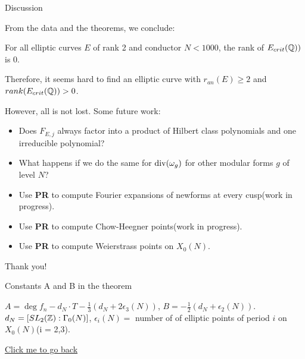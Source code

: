 \documentclass[handout]{beamer}
\begin{document}
\begin{frame}{Discussion}

From the data and the theorems, we conclude:
\begin{Corollary}
For all elliptic curves $E$ of rank 2 and conductor $N <1000$, the rank of $E_{crit}(\mathbb{Q}))$ is 0.
\end{Corollary}
\pause

Therefore, it seems hard to find an elliptic curve with $r_{an}(E) \geq 2$ and $rank(E_{crit}(\mathbb{Q})) > 0$. 

\pause
\smallskip

However, all is not lost. Some future work:

\pause 

\begin{itemize}
\item Does $F_{E,j}$ always factor into a product of Hilbert class polynomials 
and one irreducible polynomial? 

\pause 

\item What happens if we do the same for $\operatorname{div}(\omega_g)$ for other modular forms $g$
of level $N$? %

\pause

\item Use {\bf PR} to compute Fourier expansions of newforms at every cusp(work in progress).

\pause
\item Use {\bf PR} to compute Chow-Heegner points(work in progress).

\pause

\item Use {\bf PR} to compute Weierstrass points on $X_0(N)$.
\end{itemize}
\end{frame}





\begin{frame}
\Huge{\centerline{Thank you!}}
\end{frame}


\begin{frame}{Constants A and B in the theorem}
\hypertarget{consts AB}{}

$A = \deg f_n - d_N \cdot T - \frac{1}{3}(d_N + 2\epsilon_3(N))$, $B = -\frac{1}{2}(d_N+\epsilon_2(N))$. \\

$d_N  = [SL_2(\mathbb{Z}): \Gamma_0(N)]$,  $\epsilon_i(N) =$ number of of elliptic points of period $i$ on $X_0(N)$(i = 2,3).

\medskip

\hyperlink{theorem}{\small{Click me to go back}}
\end{frame}
\end{document}
